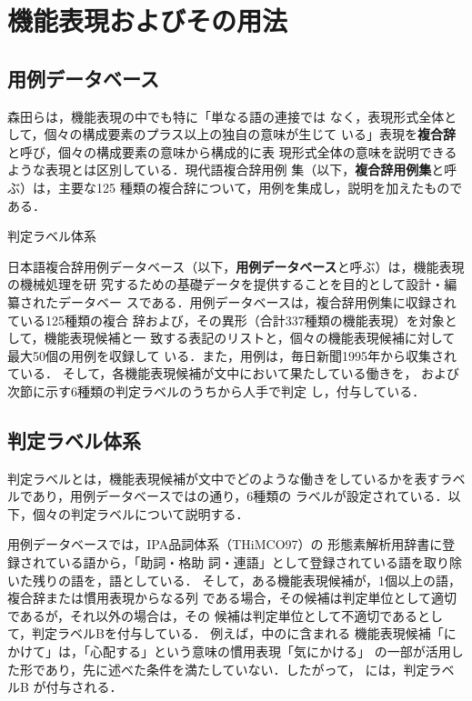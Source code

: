 \documentclass[japanese]{jnlp_1.3e}
\begin{document}
\section{機能表現およびその用法}\label{sec:fe}

\subsection{用例データベース}

森田ら\cite{Morita89aj}は，機能表現の中でも特に「単なる語の連接では
なく，表現形式全体として，個々の構成要素のプラス以上の独自の意味が生じて
いる」表現を{\bfseries 複合辞}と呼び，個々の構成要素の意味から構成的に表
現形式全体の意味を説明できるような表現とは区別している．現代語複合辞用例
集\cite{NLRI01aj-nlp}（以下，{\bfseries 複合辞用例集}と呼ぶ）は，主要な125
種類の複合辞について，用例を集成し，説明を加えたものである．

\begin{table}[t]
\setlength{\tabcolsep}{4pt}
  \caption{判定ラベル体系}
  \label{tbl:判定ラベル体系}
  \newcommand{\exlabel}[1]{}

\end{table}

日本語複合辞用例データベース\cite{日本語複合辞用例データベースの作成と分
析}（以下，{\bfseries 用例データベース}と呼ぶ）は，機能表現の機械処理を研
究するための基礎データを提供することを目的として設計・編纂されたデータベー
スである．用例データベースは，複合辞用例集に収録されている125種類の複合
辞および，その異形（合計337種類の機能表現）を対象として，機能表現候補と一
致する表記のリストと，個々の機能表現候補に対して最大50個の用例を収録して
いる．また，用例は，毎日新聞1995年から収集されている．
そして，各機能表現候補が文中において果たしている働きを，
および次節に示す6種類の判定ラベルのうちから人手で判定
し，付与している．





\subsection{判定ラベル体系}
\label{subsec:label}

判定ラベルとは，機能表現候補が文中でどのような働きをしているかを表すラベ
ルであり，用例データベースではの通り，6種類の
ラベルが設定されている．以下，個々の判定ラベルについて説明する．

用例データベースでは，IPA品詞体系（THiMCO97）の
形態素解析用辞書\cite{ipadic-2.6.1}に登録されている語から，「助詞・格助
詞・連語」として登録されている語を取り除いた残りの語を，語としている．
そして，ある機能表現候補が，1個以上の語，複合辞または慣用表現からなる列
である場合，その候補は判定単位として適切であるが，それ以外の場合は，その
候補は判定単位として不適切であるとして，判定ラベルBを付与している．
例えば，中のに含まれる
機能表現候補「にかけて」は，「心配する」という意味の慣用表現「気にかける」
の一部が活用した形であり，先に述べた条件を満たしていない．したがって，
には，判定ラベルB が付与される．
\end{document}
